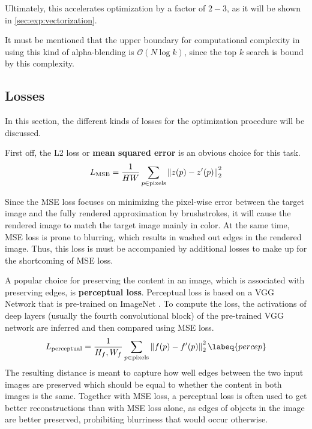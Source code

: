 Ultimately, this accelerates optimization by a factor of $2-3$, as it will be shown in \ref{sec:exp:vectorization}.

It must be mentioned that the upper boundary for computational complexity in using this kind of alpha-blending is $\mathcal{O}(N \log k)$, since the top $k$ search is bound by this complexity.

\subsection{Losses}

In this section, the different kinds of losses for the optimization procedure will be discussed.

First off, the L2 loss or \textbf{mean squared error} is an obvious choice for this task.
\begin{align}
    L_{\text{MSE}} = \frac{1}{HW} \sum_{p \in \text{pixels}} \left\lVert z(p) - z'(p)\right\rVert_2^2
\end{align}

Since the MSE loss focuses on minimizing the pixel-wise error between the target image and the fully rendered approximation by brushstrokes, it will cause the rendered image to match the target image mainly in color.
At the same time, MSE loss is prone to blurring, which results in washed out edges in the rendered image.
Thus, this loss is must be accompanied by additional losses to make up for the shortcoming of MSE loss.

A popular choice for preserving the content in an image, which is associated with preserving edges, is \textbf{perceptual loss}.
Perceptual loss is based on a VGG Network \cite{VGG} that is pre-trained on ImageNet \cite{imagenet}.
To compute the loss, the activations of deep layers (usually the fourth convolutional block) of the pre-trained VGG network are inferred and then compared using MSE loss.
\begin{align}
    L_{\text{perceptual}} = \frac{1}{H_f, W_f} \sum_{p \in \text{pixels}} \norm{f(p) - f'(p)}_2^2
    \labeq{percep}
\end{align}
The resulting distance is meant to capture how well edges between the two input images are preserved which should be equal to whether the content in both images is the same.
Together with MSE loss, a perceptual loss is often used to get better reconstructions than with MSE loss alone, as edges of objects in the image are better preserved, prohibiting blurriness that would occur otherwise.

